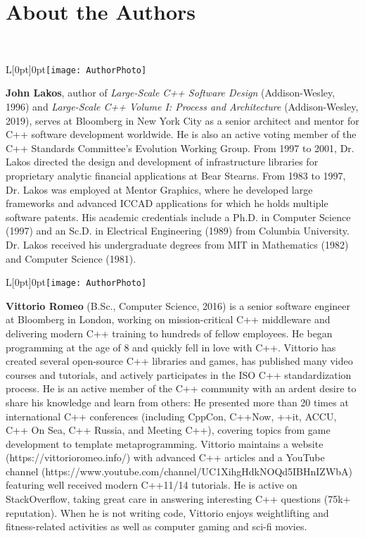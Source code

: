 \cleardoublepage
\chapter*{About the Authors}

\hspace*{\fill}\\  
\par\begin{wrapfigure}[11]{L}[0pt]{0pt}\texttt{[image: AuthorPhoto]}\end{wrapfigure}\noindent \textbf{John Lakos}, author of \textit{Large-Scale C++ Software Design} (Addison-Wesley, 1996) and \textit{Large-Scale C++ Volume I: Process and Architecture} (Addison-Wesley, 2019), serves at Bloomberg in New York City as a senior architect and mentor for C++ software development worldwide. He is also an active voting member of the C++ Standards Committee’s Evolution Working Group. From 1997 to 2001, Dr. Lakos directed the design and development of infrastructure libraries for proprietary analytic financial applications at Bear Stearns. From 1983 to 1997, Dr. Lakos was employed at Mentor Graphics, where he developed large frameworks and advanced ICCAD applications for which he holds multiple software patents. His academic credentials include a Ph.D. in Computer Science (1997) and an Sc.D. in Electrical Engineering (1989) from Columbia University. Dr. Lakos received his undergraduate degrees from MIT in Mathematics (1982) and Computer Science (1981).  

\vspace*{18pt} %
\begin{wrapfigure}[11]{L}[0pt]{0pt}\texttt{[image: AuthorPhoto]}\end{wrapfigure}\noindent \textbf{Vittorio Romeo}  (B.Sc., Computer Science, 2016) is a senior software engineer at Bloomberg in London, working on mission-critical C++ middleware and delivering modern C++ training to hundreds of fellow employees. He began programming at the age of 8 and quickly fell in love with C++. Vittorio has created several open-source C++ libraries and games, has published many video courses and tutorials, and actively participates in the ISO C++ standardization process. He is an active member of the C++ community with an ardent desire to share his knowledge and learn from others: He presented more than 20 times at international C++ conferences (including CppCon, C++Now, ++it, ACCU, C++ On Sea, C++ Russia, and Meeting C++), covering topics from game development to template metaprogramming. Vittorio maintains a website (https://vittorioromeo.info/) with advanced C++ articles and a YouTube channel (https://www.youtube.com/channel/UC1XihgHdkNOQd5IBHnIZWbA) featuring well received modern C++11/14 tutorials. He is active on StackOverflow, taking great care in answering interesting C++ questions (75k+ reputation). When he is not writing code, Vittorio enjoys weightlifting and fitness-related activities as well as computer gaming and sci-fi movies.
